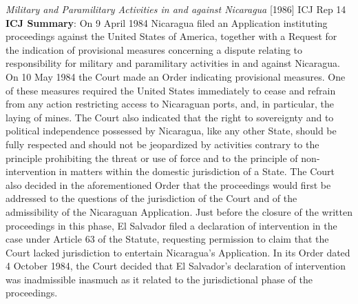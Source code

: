 \begin{casedetails}{\textit{Military and Paramilitary Activities in and against Nicaragua} [1986] ICJ Rep 14}
    \flushleft
    \textbf{ICJ Summary}: On 9 April 1984 Nicaragua filed an Application instituting proceedings against the United States of America, together with a Request for the indication of provisional measures concerning a dispute relating to responsibility for military and paramilitary activities in and against Nicaragua. On 10 May 1984 the Court made an Order indicating provisional measures. One of these measures required the United States immediately to cease and refrain from any action restricting access to Nicaraguan ports, and, in particular, the laying of mines. The Court also indicated that the right to sovereignty and to political independence possessed by Nicaragua, like any other State, should be fully respected and should not be jeopardized by activities contrary to the principle prohibiting the threat or use of force and to the principle of non-intervention in matters within the domestic jurisdiction of a State. The Court also decided in the aforementioned Order that the proceedings would first be addressed to the questions of the jurisdiction of the Court and of the admissibility of the Nicaraguan Application. Just before the closure of the written proceedings in this phase, El Salvador filed a declaration of intervention in the case under Article 63 of the Statute, requesting permission to claim that the Court lacked jurisdiction to entertain Nicaragua's Application. In its Order dated 4 October 1984, the Court decided that El Salvador's declaration of intervention was inadmissible inasmuch as it related to the jurisdictional phase of the proceedings.

    \vspace{\baselineskip}


\end{casedetails}

